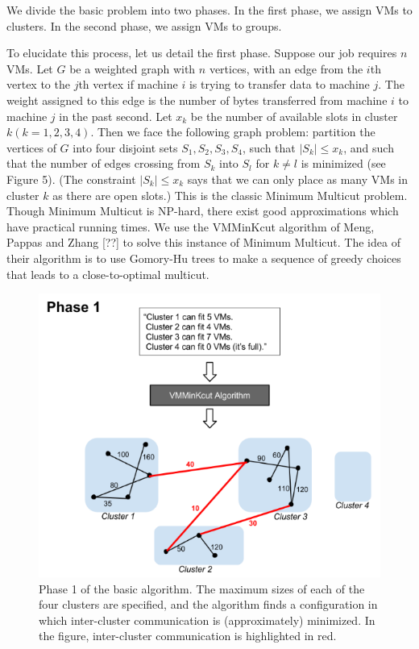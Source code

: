 \documentclass[11pt]{article}
\begin{document}
We divide the basic problem into two phases. In the first phase, we assign VMs to clusters.  In the second phase, we assign VMs to groups.

To elucidate this process, let us detail the first phase.  Suppose our job requires $n$ VMs.  Let $G$ be a weighted graph with $n$ vertices, with an edge from the $i$th vertex to the $j$th vertex if machine $i$ is trying to transfer data to machine $j$.  The weight assigned to this edge is the number of bytes transferred from machine $i$ to machine $j$ in the past second.  Let $x_k$ be the number of available slots in cluster $k (k = 1,2,3,4)$.  Then we face the following graph problem: partition the vertices of $G$ into four disjoint sets $S_1, S_2, S_3, S_4$, such that $|S_k| \leq x_k$, and such that the number of edges crossing from $S_k$ into $S_l$ for $k \neq l$ is minimized (see Figure 5).  (The constraint $|S_k| \leq x_k$ says that we can only place as many VMs in cluster $k$ as there are open slots.)  This is the classic Minimum Multicut problem.  Though Minimum Multicut is NP-hard, there exist good approximations which have practical running times.  We use the VMMinKcut algorithm of Meng, Pappas and Zhang [??] to solve this instance of Minimum Multicut.  The idea of their algorithm is to use Gomory-Hu trees to make a sequence of greedy choices that leads to a close-to-optimal multicut.

\begin{figure}
  \centering
\includegraphics[scale=0.7]{phase1.png}

 \caption{Phase 1 of the basic algorithm.  The maximum sizes of each of the four clusters are specified, and the algorithm finds a configuration in which inter-cluster communication is (approximately) minimized.  In the figure, inter-cluster communication is highlighted in red.}
 
\end{figure}
\end{document}

